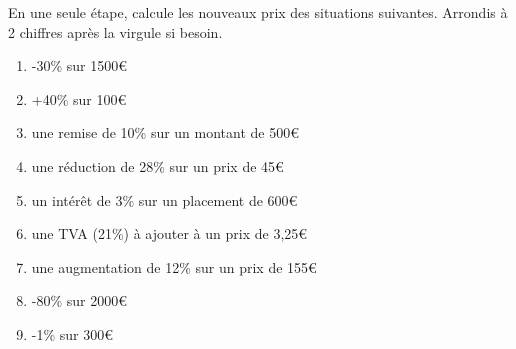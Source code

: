 \documentclass[10pt,a4paper]{article}
\begin{document}
\newpage
\begin{exercise}
	En une seule étape, calcule les nouveaux prix des situations suivantes. Arrondis à 2 chiffres après la virgule si besoin.
	\begin{enumerate}[cols=2]
		\item -30\% sur 1500€
		\item +40\% sur 100€
		\item une remise de 10\% sur un montant de 500€
		\item une réduction de 28\% sur un prix de 45€
		\item un intérêt de 3\% sur un placement de 600€
		\item une TVA (21\%) à ajouter à un prix de 3,25€
		\item une augmentation de 12\% sur un prix de 155€
		\item -80\% sur 2000€
		\item -1\% sur 300€
	\end{enumerate}
\end{exercise}
\end{document}
